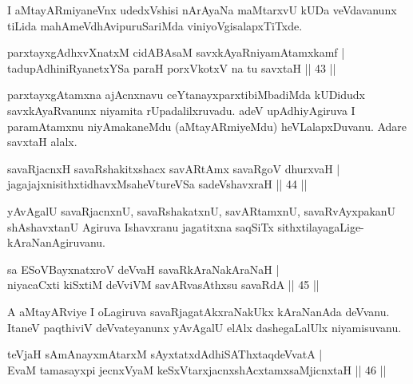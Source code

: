 \begin{artha}
I aMtayARmiyaneVnx udedxVshisi nArAyaNa maMtarxvU kUDa veVdavanunx tiLida mahAmeVdhAvipuruSariMda viniyoVgisalapxTiTxde.
\end{artha}

\begin{shl}
parxtayxgAdhxvXnatxM cidABAsaM savxkAyaRniyamAtamxkamf |\\
tadupAdhiniRyanetxYSa paraH porxVkotxV na tu savxtaH \hfill || 43 ||
\end{shl}

\begin{artha}%
parxtayxgAtamxna ajAcnxnavu ceYtanayxparxtibiMbadiMda kUDidudx savxkAyaRvanunx niyamita rUpadalilxruvadu. adeV upAdhiyAgiruva I paramAtamxnu niyAmakaneMdu (aMtayARmiyeMdu) heVLalapxDuvanu. Adare savxtaH alalx.
\end{artha}

\begin{shl}
savaRjacnxH savaRshakitxshacx savARtAmx savaRgoV dhurxvaH |\\
jagajajxnisithxtidhavxMsaheVtureVSa sadeVshavxraH \hfill || 44 ||
\end{shl}

\begin{artha}
yAvAgalU savaRjacnxnU, savaRshakatxnU, savARtamxnU, savaRvAyxpakanU shAshavxtanU Agiruva Ishavxranu jagatitxna saqSiTx sithxtilayagaLige-kAraNanAgiruvanu.
\end{artha}


\begin{shl}
sa ESoV\s BayxnatxroV deVvaH savaRkAraNakAraNaH |\\
niyacaCxti kiSxtiM deVviVM savARvasAthxsu savaRdA \hfill || 45 ||
\end{shl}

\begin{artha}
A aMtayARviye I oLagiruva savaRjagatAkxraNakUkx kAraNanAda deVvanu. ItaneV paqthiviV deVvateyanunx yAvAgalU elAlx dashegaLalUlx niyamisuvanu.
\end{artha}


\begin{shl}
teVjaH sAmAnayxmAtarxM sAyxtatxdAdhiSAThxtaqdeVvatA |\\
EvaM tamasayxpi jecnxVyaM keSxVtarxjacnxshAcx\s \s tamxsaMjicnxtaH \hfill || 46 ||
\end{shl}

